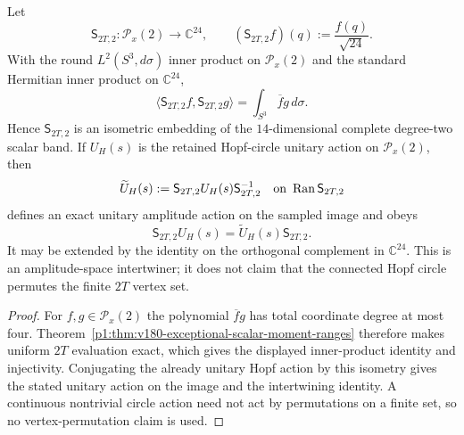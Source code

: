 \documentclass[11pt]{article}
\begin{document}
\begin{corollary}
\label{p1:cor:v185-2t-degree-two-sampling-isometry}
Let
\[
 \mathsf S_{2T,2}:\mathcal P_x(2)\longrightarrow\mathbb C^{24},
 \qquad
 (\mathsf S_{2T,2}f)(q):=\frac{f(q)}{\sqrt{24}}.
\]
With the round $L^2(S^3,d\sigma)$ inner product on $\mathcal P_x(2)$ and the
standard Hermitian inner product on $\mathbb C^{24}$,
\[
 \boxed{
 \langle \mathsf S_{2T,2}f,\mathsf S_{2T,2}g\rangle
 =\int_{S^3}\overline f g\,d\sigma .}
\]
Hence $\mathsf S_{2T,2}$ is an isometric embedding of the $14$-dimensional
complete degree-two scalar band.  If $U_H(s)$ is the retained Hopf-circle
unitary action on $\mathcal P_x(2)$, then
\[
 \widetilde U_H(s)
 :=\mathsf S_{2T,2}U_H(s)\mathsf S_{2T,2}^{-1}
 \quad\hbox{on }\operatorname{Ran}\mathsf S_{2T,2}
\]
defines an exact unitary amplitude action on the sampled image and obeys
\[
 \boxed{\mathsf S_{2T,2}U_H(s)=\widetilde U_H(s)\mathsf S_{2T,2}.}
\]
It may be extended by the identity on the orthogonal complement in
$\mathbb C^{24}$.  This is an amplitude-space intertwiner; it does not claim
that the connected Hopf circle permutes the finite $2T$ vertex set.
\end{corollary}
\begin{proof}
For $f,g\in\mathcal P_x(2)$ the polynomial $\overline f g$ has total
coordinate degree at most four.  Theorem~\ref{p1:thm:v180-exceptional-scalar-moment-ranges}
therefore makes uniform $2T$ evaluation exact, which gives the displayed
inner-product identity and injectivity.  Conjugating the already unitary Hopf
action by this isometry gives the stated unitary action on the image and the
intertwining identity.  A continuous nontrivial circle action need not act by
permutations on a finite set, so no vertex-permutation claim is used.
\end{proof}
\end{document}
